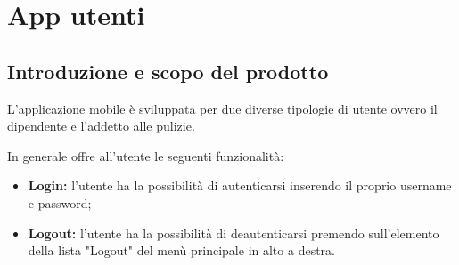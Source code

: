 \section{App utenti}

\subsection{Introduzione e scopo del prodotto}
L'applicazione mobile è sviluppata per due diverse tipologie di utente ovvero il dipendente e l'addetto alle pulizie.

In generale offre all'utente le seguenti funzionalità:
\begin{itemize}
	\item \textbf{Login:} l'utente ha la possibilità di autenticarsi inserendo il proprio username e password; \\
	\item \textbf{Logout:} l'utente ha la possibilità di deautenticarsi premendo sull'elemento della lista "Logout" del menù principale in alto a destra. \\
\end{itemize}

